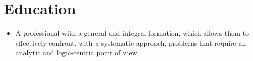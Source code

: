 \documentclass{my_cv}
\begin{document}
\makecvtitle

\vspace*{-1cm}

\section{Education \faBook} 
\begin{itemize}
\item A professional with a general and integral formation, which allows them to effectively confront, with a systematic approach, problems that require an analytic and logic-centric point of view. 
\end{itemize}
\end{document}
